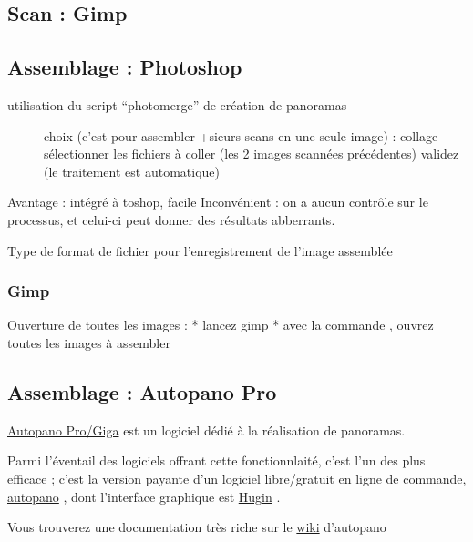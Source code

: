 \documentclass[a4paper,12pt,french]{sphinxmanual}
\begin{document}
\subsection{Scan : Gimp}
\label{psd/scan+assemblage_psd+gimp+autopano:scan-gimp}

\subsection{Assemblage : Photoshop}
\label{psd/scan+assemblage_psd+gimp+autopano:assemblage-photoshop}
utilisation du script ``photomerge'' de création de panoramas
\begin{description}
\item[{}] \leavevmode
choix (c'est pour assembler +sieurs scans en une seule image) : collage
sélectionner les fichiers à coller (les 2 images scannées précédentes)
validez (le traitement est automatique)

\end{description}

Avantage : intégré à toshop, facile
Inconvénient : on a aucun contrôle sur le processus, et celui-ci peut donner des résultats abberrants.

Type de format de fichier pour l'enregistrement de l'image assemblée


\subsubsection{Gimp}
\label{psd/scan+assemblage_psd+gimp+autopano:id1}
Ouverture de toutes les images :
* lancez gimp
* avec la commande , ouvrez toutes les images à assembler


\subsection{Assemblage : Autopano Pro}
\label{psd/scan+assemblage_psd+gimp+autopano:assemblage-autopano-pro}
\href{http://www.autopano.net/fr}{Autopano Pro/Giga} est un logiciel dédié à la réalisation de panoramas.

Parmi l'éventail des logiciels offrant cette fonctionnlaité, c'est l'un des plus efficace ; c'est la version payante d'un logiciel libre/gratuit en ligne de commande, \href{http://autopano.kolor.com/}{autopano} , dont l'interface graphique est \href{http://hugin.sourceforge.net/}{Hugin} .

Vous trouverez une documentation très riche sur le \href{http://www.autopano.net/wiki-fr/action/view/Accueil}{wiki} d'autopano
\end{document}
